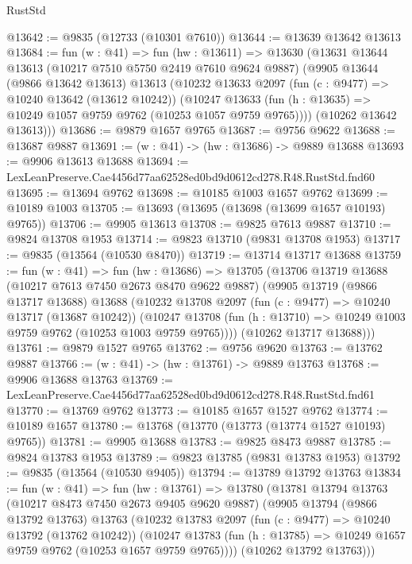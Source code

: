 \begin{lexlean}{RustStd}
\begin{coremodule}
@13642 := @9835 (@12733 (@10301 @7610))
@13644 := @13639 @13642 @13613
@13684 := fun (w : @41) =>
  fun (hw : @13611) =>
  @13630
    (@13631
      @13644
      @13613
      (@10217 @7510 @5750 @2419 @7610 @9624 @9887)
      (@9905
        @13644
        (@9866 @13642 @13613)
        @13613
        (@10232
          @13633
          @2097
          (fun (c : @9477) => @10240 @13642 (@13612 @10242))
          (@10247 @13633 (fun (h : @13635) => @10249 @1057 @9759 @9762 (@10253 @1057 @9759 @9765))))
        (@10262 @13642 @13613)))
@13686 := @9879 @1657 @9765
@13687 := @9756 @9622
@13688 := @13687 @9887
@13691 := (w : @41) -> (hw : @13686) -> @9889 @13688
@13693 := @9906 @13613 @13688
@13694 := LexLeanPreserve.Cae4456d77aa62528ed0bd9d0612cd278.R48.RustStd.fnd60
@13695 := @13694 @9762
@13698 := @10185 @1003 @1657 @9762
@13699 := @10189 @1003
@13705 := @13693 (@13695 (@13698 (@13699 @1657 @10193) @9765))
@13706 := @9905 @13613
@13708 := @9825 @7613 @9887
@13710 := @9824 @13708 @1953
@13714 := @9823 @13710 (@9831 @13708 @1953)
@13717 := @9835 (@13564 (@10530 @8470))
@13719 := @13714 @13717 @13688
@13759 := fun (w : @41) =>
  fun (hw : @13686) =>
  @13705
    (@13706
      @13719
      @13688
      (@10217 @7613 @7450 @2673 @8470 @9622 @9887)
      (@9905
        @13719
        (@9866 @13717 @13688)
        @13688
        (@10232
          @13708
          @2097
          (fun (c : @9477) => @10240 @13717 (@13687 @10242))
          (@10247 @13708 (fun (h : @13710) => @10249 @1003 @9759 @9762 (@10253 @1003 @9759 @9765))))
        (@10262 @13717 @13688)))
@13761 := @9879 @1527 @9765
@13762 := @9756 @9620
@13763 := @13762 @9887
@13766 := (w : @41) -> (hw : @13761) -> @9889 @13763
@13768 := @9906 @13688 @13763
@13769 := LexLeanPreserve.Cae4456d77aa62528ed0bd9d0612cd278.R48.RustStd.fnd61
@13770 := @13769 @9762
@13773 := @10185 @1657 @1527 @9762
@13774 := @10189 @1657
@13780 := @13768 (@13770 (@13773 (@13774 @1527 @10193) @9765))
@13781 := @9905 @13688
@13783 := @9825 @8473 @9887
@13785 := @9824 @13783 @1953
@13789 := @9823 @13785 (@9831 @13783 @1953)
@13792 := @9835 (@13564 (@10530 @9405))
@13794 := @13789 @13792 @13763
@13834 := fun (w : @41) =>
  fun (hw : @13761) =>
  @13780
    (@13781
      @13794
      @13763
      (@10217 @8473 @7450 @2673 @9405 @9620 @9887)
      (@9905
        @13794
        (@9866 @13792 @13763)
        @13763
        (@10232
          @13783
          @2097
          (fun (c : @9477) => @10240 @13792 (@13762 @10242))
          (@10247 @13783 (fun (h : @13785) => @10249 @1657 @9759 @9762 (@10253 @1657 @9759 @9765))))
        (@10262 @13792 @13763)))

\end{coremodule}
\end{lexlean}
